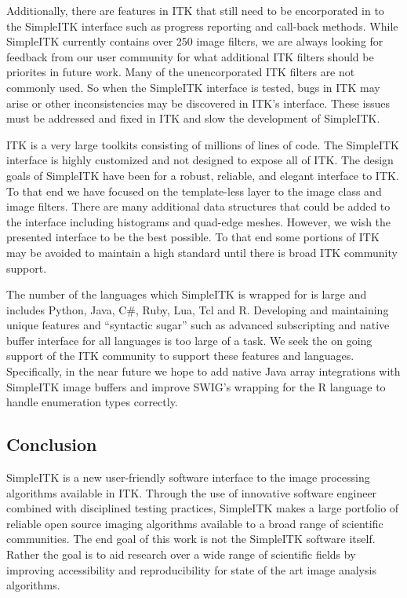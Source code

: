 \documentclass{frontiersMED} %
\begin{document}
Additionally, there are features in ITK that still need to be encorporated
in to the SimpleITK interface such as progress reporting and call-back
methods. While SimpleITK currently contains over 250 image filters,
we are always looking for feedback from our user community for
what additional ITK filters should be priorites in future
work. Many of the unencorporated ITK filters are not commonly used. So when the
SimpleITK interface is tested, bugs in ITK may arise or other
inconsistencies may be discovered in ITK's interface. These issues must be
addressed and fixed in ITK and slow the development of SimpleITK.

ITK is a very large toolkits consisting of millions of lines of
code. The SimpleITK interface is highly customized and not designed to
expose all of ITK. The design goals of SimpleITK have been
for a robust, reliable, and elegant interface to ITK. To that end we
have focused on the template-less layer to the image class and image
filters.  There are many additional data structures that could be
added to the interface including histograms and quad-edge
meshes. However, we wish the presented interface to be the best
possible. To that end some portions of ITK may be avoided to
maintain a high standard until there is broad ITK community support.

The number of the languages which SimpleITK is wrapped for is large
and includes Python, Java, C\#, Ruby, Lua, Tcl and R. Developing and
maintaining unique features and ``syntactic sugar'' such as advanced
subscripting and native buffer interface for all languages is too
large of a task. We seek the on going support of the ITK community to
support these features and languages. Specifically, in the near future
we hope to add native Java array integrations with SimpleITK image
buffers and improve SWIG's wrapping for the R language to handle
enumeration types correctly.

\subsection{Conclusion}
SimpleITK is a new user-friendly software interface to the image
processing algorithms available in ITK. Through the use of innovative
software engineer combined with disciplined testing practices,
SimpleITK makes a large portfolio of reliable open source imaging
algorithms available to a broad range of scientific communities. The
end goal of this work is not the SimpleITK software itself. Rather the
goal is to aid research over a wide range of scientific fields by
improving accessibility and reproducibility for state of the art image
analysis algorithms.
\end{document}

